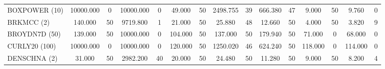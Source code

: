 \begin{table}
\begin{tabular}{lcccccccccccccc}
    BOXPOWER (10) & 10000.000 & 0  & 10000.000 & 0  & 49.000  & 50 & 2498.755  & 39 & 666.380 & 47 & 9.000   & 50 & 9.760   & 0 \\[1ex]
    BRKMCC (2)    & 140.000   & 50 & 9719.800  & 1  & 21.000  & 50 & 25.880    & 48 & 12.660  & 50 & 4.000   & 50 & 3.820   & 9 \\[1ex]
    BROYDN7D (50) & 139.000   & 50 & 10000.000 & 0  & 104.000 & 50 & 137.000   & 50 & 179.940 & 50 & 71.000  & 0  & 68.000  & 0 \\[1ex]
    CURLY20 (100) & 10000.000 & 0  & 10000.000 & 0  & 120.000 & 50 & 1250.020  & 46 & 624.240 & 50 & 118.000 & 0  & 114.000 & 0 \\[1ex]
    DENSCHNA (2)  & 31.000    & 50 & 2982.200  & 40 & 20.000  & 50 & 24.480    & 50 & 11.280  & 50 & 9.000   & 50 & 8.200   & 4 \\
    \bottomrule
    \end{tabular}
    
\end{table}
    
\newpage
